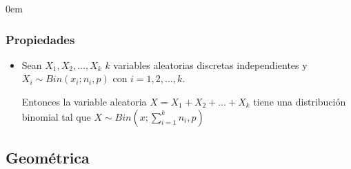\documentclass[12pt, fleqn]{report}                             %
\newenvironment{SmallIndentation}[1][0.75em]                    %
        {\begin{adjustwidth}{#1}{}\begin{footnotesize}}             %
        {\end{footnotesize}\end{adjustwidth}}                       %
\theoremstyle{break}                                            %
\newcommand{\Wrap}[1]{\left( #1 \right)}                        %
\begin{document}
\begin{multicols}{2}
\begin{SmallIndentation}[0em]
                    \subsubsection{Propiedades}  

                        \begin{itemize}
                            
                            \item 

                                Sean $X_1, X_2, \dots, X_k$ $k$ variables aleatorias discretas independientes
                                y $X_i \sim Bin(x_i; n_i, p)$ con $i = 1, 2, \dots, k$.

                                Entonces la variable aleatoria $X = X_1 + X_2 + \dots + X_k$ tiene una 
                                distribución binomial tal que $X \sim Bin\Wrap{x; \sum_{i=1}^k n_i, p}$ 

                        \end{itemize}


                \end{SmallIndentation}
                \end{multicols}



            \clearpage
            \subsection{Geométrica}
\end{document}
